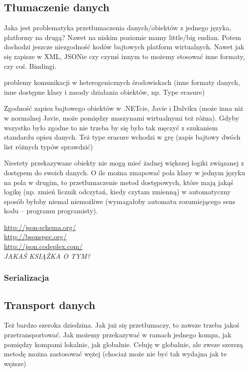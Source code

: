 \subsection{Tłumaczenie danych}
Jaka jest problematyka przetłumaczenia danych/obiektów z jednego języka, platformy na drugą?
Nawet na niskim poziomie mamy little/big endian. Potem dochodzi jeszcze niezgodność kodów bajtowych platform wirtualnych.
Nawet jak się zapisze w XML, JSONie czy czymś innym to możemy stosować inne formaty, czy coś. Bindingi.

problemy komunikacji w heterogenicznych środowiskach (inne formaty danych, inne dostępne klasy i zasady działania obiektów, np. Type erasure)

Zgodność zapisu bajtowego obiektów w .NETcie, Javie i Dalviku (może inna niż w normalnej Javie, może pomiędzy maszynami wirtualnymi też różna). Gdyby wszystko było zgodne to nie trzeba by się było tak męczyć z szukaniem standardu opisu danych. Też type erasure wchodzi w grę (zapis bajtowy dwóch list różnych typów sprawdzić)

Niestety przekazywane obiekty nie mogą mieć żadnej większej logiki związanej z dostępem do swoich danych. O ile można zmapować pola klasy w jednym języku na pola w drugim, to przetłumaczenie metod dostępowych, które mają jakąś logikę (np. zmień licznik odczytań, kiedy czytam zmienną) w automatyczny sposób byłoby niemal niemożliwe (wymagałoby automatu rozumiejącego sens kodu -- programu programisty).

\url{http://json-schema.org/}\\
\url{http://bsonspec.org/}\\
\url{http://json.codeplex.com/}\\

\emph{JAKAŚ KSIĄŻKA O TYM?}

\subsubsection{Serializacja}

\subsection{Transport danych}
Też bardzo szeroka dziedzina. Jak już się przetłumaczy, to zawsze trzeba jakoś przetransportować. Jak możemy przekazywać w ramach jednego kompa, jak pomiędzy kompami lokalnie, jak globalnie.
Celuję w globalnie, ale zwsze szerszą metodę można zastosować wężej (chociaż może nie być tak wydajna jak te węższe)

